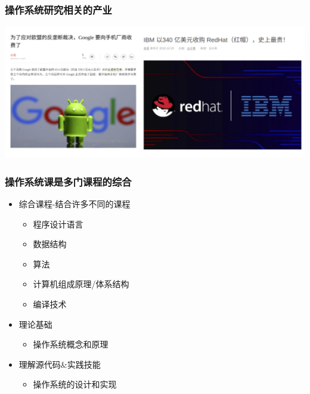 \documentclass[UTF8]{ctexbeamer}
\begin{document}
\begin{frame}
    \frametitle{操作系统研究相关的产业}
     \includegraphics[width=1.0\linewidth]{companies-os}
\end{frame}

\begin{frame}
    \frametitle{操作系统课是多门课程的综合}
    \begin{itemize}
        \item 综合课程-结合许多不同的课程
        \begin{itemize}
            \item 程序设计语言
            \item 数据结构
            \item 算法
            \item 计算机组成原理/体系结构
            \item 编译技术
        \end{itemize}        
        \item 理论基础
        \begin{itemize}
            \item 操作系统概念和原理
        \end{itemize}
        \item 理解源代码\&实践技能
        \begin{itemize}
            \item 操作系统的设计和实现
        \end{itemize}
    \end{itemize}
\end{frame}

\end{document}
